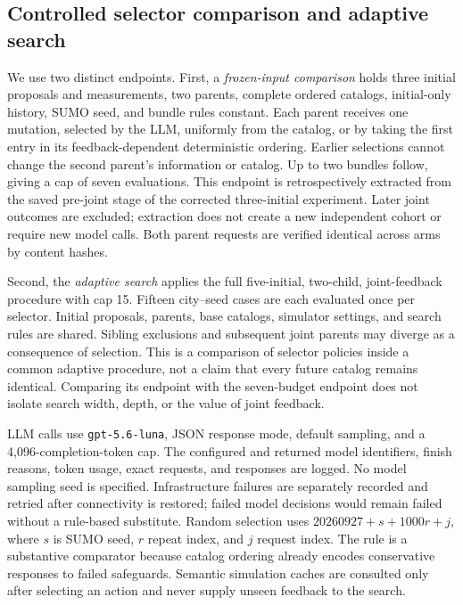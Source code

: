 \documentclass[11pt]{article}
\begin{document}
\subsection{Controlled selector comparison and adaptive search}\label{sec:matched}
We use two distinct endpoints. First, a \emph{frozen-input comparison} holds three initial proposals and measurements, two parents, complete ordered catalogs, initial-only history, SUMO seed, and bundle rules constant. Each parent receives one mutation, selected by the LLM, uniformly from the catalog, or by taking the first entry in its feedback-dependent deterministic ordering. Earlier selections cannot change the second parent's information or catalog. Up to two bundles follow, giving a cap of seven evaluations. This endpoint is retrospectively extracted from the saved pre-joint stage of the corrected three-initial experiment. Later joint outcomes are excluded; extraction does not create a new independent cohort or require new model calls. Both parent requests are verified identical across arms by content hashes.

Second, the \emph{adaptive search} applies the full five-initial, two-child, joint-feedback procedure with cap 15. Fifteen city--seed cases are each evaluated once per selector. Initial proposals, parents, base catalogs, simulator settings, and search rules are shared. Sibling exclusions and subsequent joint parents may diverge as a consequence of selection. This is a comparison of selector policies inside a common adaptive procedure, not a claim that every future catalog remains identical. Comparing its endpoint with the seven-budget endpoint does not isolate search width, depth, or the value of joint feedback.

LLM calls use \texttt{gpt-5.6-luna}, JSON response mode, default sampling, and a 4,096-completion-token cap. The configured and returned model identifiers, finish reasons, token usage, exact requests, and responses are logged. No model sampling seed is specified. Infrastructure failures are separately recorded and retried after connectivity is restored; failed model decisions would remain failed without a rule-based substitute. Random selection uses $20260927+s+1000r+j$, where $s$ is SUMO seed, $r$ repeat index, and $j$ request index. The rule is a substantive comparator because catalog ordering already encodes conservative responses to failed safeguards. Semantic simulation caches are consulted only after selecting an action and never supply unseen feedback to the search.
\end{document}
